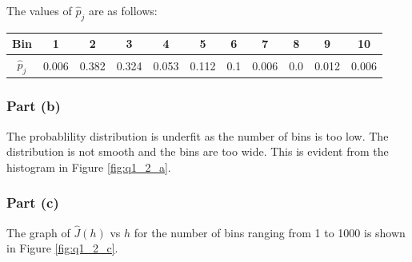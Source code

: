 The values of $\hat{p}_j$ are as follows:

\begin{tabular}
    { |c|c|c|c|c|c|c|c|c|c|c| }
    \hline
    Bin & 1 & 2 & 3 & 4 & 5 & 6 & 7 & 8 & 9 & 10 \\
    \hline
    $\hat{p}_j$ & 0.006 & 0.382 & 0.324 & 0.053 & 0.112 & 0.1 & 0.006 & 0.0 & 0.012 & 0.006 \\
    \hline
\end{tabular}

\subsubsection{Part (b)}

The probablility distribution is underfit as the number of bins is too low. The distribution is not smooth and the bins are too wide. This is evident from the histogram in Figure \ref{fig:q1_2_a}.

\subsubsection{Part (c)}

The graph of $\hat{J}(h)$ vs $h$ for the number of bins ranging from 1 to 1000 is shown in Figure \ref{fig:q1_2_c}.


